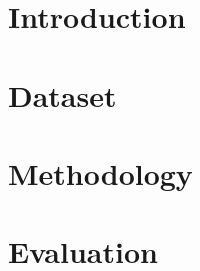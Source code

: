 \documentclass[10pt,sigconf]{acmart}
\begin{document}


\maketitle

\section{Introduction}



\section{Dataset}



\section{Methodology}



\section{Evaluation}

\end{document}
